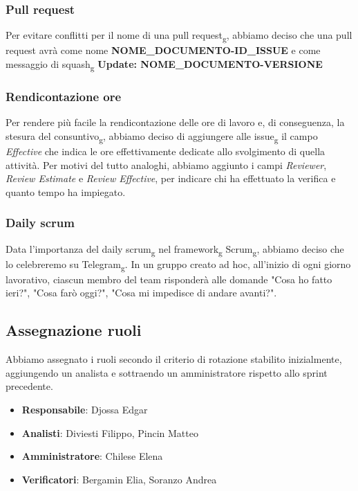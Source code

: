         \subsubsection{Pull request}
            Per evitare conflitti per il nome di una pull request\textsubscript{g}, abbiamo
            deciso che una pull request avrà come nome \textbf{NOME\_DOCUMENTO-ID\_ISSUE} e
            come messaggio di squash\textsubscript{g} \textbf{Update: NOME\_DOCUMENTO-VERSIONE}
        \subsubsection{Rendicontazione ore}
            Per rendere più facile la rendicontazione delle ore di lavoro e, di
            conseguenza, la stesura del consuntivo\textsubscript{g}, abbiamo deciso di aggiungere alle
            issue\textsubscript{g} il campo \textit{Effective} che indica le ore
            effettivamente dedicate allo svolgimento di quella attività. Per motivi del
            tutto analoghi, abbiamo aggiunto i campi \textit{Reviewer}, \textit{Review
                Estimate} e \textit{Review Effective}, per indicare chi ha effettuato la
            verifica e quanto tempo ha impiegato.
        \subsubsection{Daily scrum}
            Data l'importanza del daily scrum\textsubscript{g} nel
            framework\textsubscript{g} Scrum\textsubscript{g}, abbiamo deciso che lo
            celebreremo su Telegram\textsubscript{g}. In un gruppo creato ad hoc,
            all'inizio di ogni giorno lavorativo, ciascun membro del team risponderà alle
            domande "Cosa ho fatto ieri?", "Cosa farò oggi?", "Cosa mi impedisce di andare
            avanti?".
    \subsection{Assegnazione ruoli}
        Abbiamo assegnato i ruoli secondo il criterio di rotazione stabilito inizialmente,
        aggiungendo un analista e sottraendo un amministratore rispetto allo sprint precedente.
        \begin{itemize}
            \item \textbf{Responsabile}: Djossa Edgar
            \item \textbf{Analisti}: Diviesti Filippo, Pincin Matteo
            \item \textbf{Amministratore}: Chilese Elena
            \item \textbf{Verificatori}: Bergamin Elia, Soranzo Andrea
        \end{itemize}

